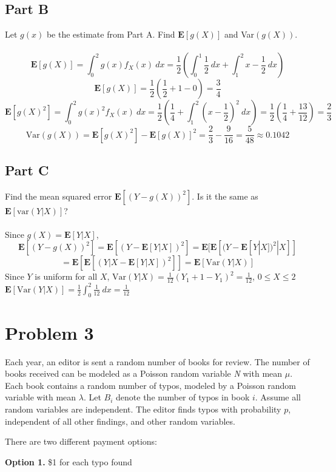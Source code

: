 \documentclass{amsart}
\begin{document}
	\subsection{Part B}
	Let $g(x)$ be the estimate from Part A. Find $\mathbf{E}[g(X)]$ and Var$(g(X))$.\\
	\\
	\[
	\mathbf{E}[g(X)] = \int_{0}^{2}g(x)f_X(x)~dx = 
	\frac{1}{2}\left(
	\int_{0}^{1}\frac{1}{2}~dx + \int_{1}^{2}x-\frac{1}{2}~dx
	\right)
	\]
	\[
	\mathbf{E}[g(X)] = \frac{1}{2}\left(
	\frac{1}{2} + 1 - 0
	\right) = \frac{3}{4}
	\]
	\[
	\mathbf{E}[g(X)^2] = \int_{0}^{2} g(x)^2f_X(x)~dx=
	\frac{1}{2}\left(
	\frac{1}{4} + \int_{1}^{2}(x-\frac{1}{2})^2~dx
	\right) = \frac{1}{2}(\frac{1}{4}+\frac{13}{12}) = \frac{2}{3}
	\]
	\[
	\text{Var}(g(X)) = \mathbf{E}[g(X)^2] - \mathbf{E}[g(X)]^2 = \frac{2}{3} - \frac{9}{16} = \frac{5}{48} \approx 0.1042
	\]
	\subsection{Part C}
	Find the mean squared error $\mathbf{E}[(Y-g(X))^2]$. Is it the same as $\mathbf{E}[\text{var}(Y|X)]$?\\
	\\
	Since $g(X)=\mathbf{E}[Y|X]$,
	\[
	\mathbf{E}[(Y-g(X))^2] = \mathbf{E}[(Y-\mathbf{E}[Y|X])^2]=
	\mathbf{E}[\mathbf{E}[(Y-\mathbf{E}[Y|X])^2|X]]
	\]
	\[
	= \mathbf{E}[\mathbf{E}[(Y|X-\mathbf{E}[Y|X])^2]]=
	\mathbf{E}[\text{Var}(Y|X)]
	\]
	Since $Y$ is uniform for all $X$, $\text{Var}(Y|X) = \frac{1}{12}(Y_1+1-Y_1)^2 = \frac{1}{12}$, $0\leq X\leq2$\\
	$\mathbf{E}[\text{Var}(Y|X)] = \frac{1}{2}\int_{0}^{2} \frac{1}{12}~dx = \frac{1}{12}$
	\pagebreak
	\section{Problem 3}
	Each year, an editor is sent a random number of books for review. The number of books received can be modeled as a Poisson random variable \textit{N} with mean $\mu$. Each book contains a random number of typos, modeled by a Poisson random variable with mean $\lambda$. Let $B_i$ denote the number of typos in book $i$. Assume all random variables are independent. The editor finds typos with probability $p$, independent of all other findings, and other random variables.
	
	There are two different payment options:
	
	\textbf{Option 1.} \$1 for each typo found
	
\end{document}
